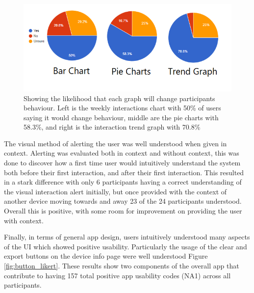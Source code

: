 \documentclass{l4proj}
\begin{document}
\begin{figure}[!htb]
    \centering
    \includegraphics[width=0.9\linewidth]{images/behaviour-graphs.png}

    \caption{ Showing the likelihood that each graph will change participants behaviour. Left is the weekly interactions chart with 50\% of users saying it would change behaviour, middle are the pie charts with 58.3\%, and right is the interaction trend graph with 70.8\% }

    \label{fig:behaviour}
\end{figure}

The visual method of alerting the user was well understood when given in context. Alerting was evaluated both in context and without context, this was done to discover how a first time user would intuitively understand the system both before their first interaction, and after their first interaction. This resulted in a stark difference with only 6 participants having a correct understanding of the visual interaction alert initially, but once provided with the context of another device moving towards and away 23 of the 24 participants understood. Overall this is positive, with some room for improvement on providing the user with context.

Finally, in terms of general app design, users intuitively understood many aspects of the UI which showed positive usability. Particularly the usage of the clear and export buttons on the device info page were well understood Figure \ref{fig:button_likert}. These results show two components of the overall app that contribute to having 157 total positive app usability codes (NA1) across all participants.
\end{document}
